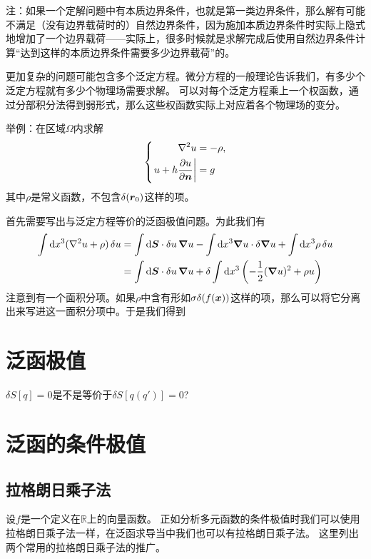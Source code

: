 \documentclass[UTF8]{ctexart}
\newcommand*{\reals}{\mathbb{R}}
\begin{document}
注：如果一个定解问题中有本质边界条件，也就是第一类边界条件，那么解有可能不满足（没有边界载荷时的）自然边界条件，因为施加本质边界条件时实际上隐式地增加了一个边界载荷——实际上，很多时候就是求解完成后使用自然边界条件计算“达到这样的本质边界条件需要多少边界载荷”的。

更加复杂的问题可能包含多个泛定方程。微分方程的一般理论告诉我们，有多少个泛定方程就有多少个物理场需要求解。
可以对每个泛定方程乘上一个权函数，通过分部积分法得到弱形式，那么这些权函数实际上对应着各个物理场的变分。

举例：在区域$\Omega$内求解
\begin{equation}
    \left\{
        \begin{aligned}
            \laplacian u &= - \rho, \\
            \eval{u + h\pdv{u}{\vb*{n}}} &= g
        \end{aligned}
    \right. 
\end{equation}
其中$\rho$是常义函数，不包含$\delta(\vb*{r}_0)$这样的项。

首先需要写出与泛定方程等价的泛函极值问题。为此我们有
\[
    \begin{aligned}
        \int \dd x^3 (\laplacian u + \rho) \var{u} &= 
            \int \dd \vb*{S} \cdot \var{u} \grad{u} -  \int \dd x^3 \grad{u} \cdot \var{\grad{u}} +  \int \dd x^3 \rho \var{u} \\
        &= \int \dd \vb*{S} \cdot \var{u} \grad{u} + \var{\int \dd x^3 \left(
            - \frac{1}{2} (\grad{u})^2 + \rho u
        \right)}
    \end{aligned}
\]
注意到有一个面积分项。如果$\rho$中含有形如$\sigma \delta(f(\vb*{x}))$这样的项，那么可以将它分离出来写进这一面积分项中。于是我们得到

\section{泛函极值}

$\delta S[q]=0$是不是等价于$\delta S[q(q')] = 0$?

\section{泛函的条件极值}

\subsection{拉格朗日乘子法}
设$f$是一个定义在$\reals$上的向量函数。
正如分析多元函数的条件极值时我们可以使用拉格朗日乘子法一样，在泛函求导当中我们也可以有拉格朗日乘子法。
这里列出两个常用的拉格朗日乘子法的推广。
\end{document}
